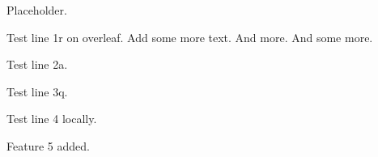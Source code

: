 

Placeholder.

Test line 1r on overleaf. Add some more text. And more.
And some more.

Test line 2a.

Test line 3q.

Test line 4 locally.

Feature 5 added.

